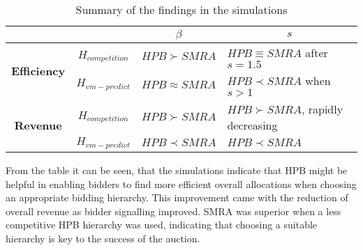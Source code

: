 \begin{table}[h]
	\centering
\begin{tabular}{cc|l|l|}
	\cline{3-4}
	\multicolumn{1}{l}{}                       & \multicolumn{1}{l|}{} & \multicolumn{1}{c|}{\textbf{$\beta$}} & \multicolumn{1}{c|}{\textbf{$s$}} \\ \hline
	\multicolumn{1}{|c|}{\multirow{2}{*}{\textbf{Efficiency}}} & $ H_{competition} $                    & $  HPB \succ SMRA $                         & $ HPB \equiv SMRA $ after $ s= 1.5 
	$                      \\ \cline{2-4} 
	\multicolumn{1}{|c|}{}                     & $ H_{vm-predict} $                 & $ HPB \approx SMRA$                         & $ HPB \prec SMRA $ when $ s > 1 $                      \\ \hline
	\multicolumn{1}{|c|}{\multirow{2}{*}{\textbf{Revenue}}} & $ H_{competition} $                    & $ HPB \succ SMRA $                         & $ HPB \succ SMRA $, rapidly decreasing                      \\ \cline{2-4} 
	\multicolumn{1}{|c|}{}                     & $ H_{vm-predict} $                  & $ HPB \prec SMRA $                         & $ HPB \prec SMRA $                      \\ \hline
\end{tabular}
	\caption{Summary of the findings in the simulations}\label{tbl:sim-results-summary}
\end{table}

From the table it can be seen, that the simulations indicate that HPB might be helpful in enabling bidders to find more efficient overall allocations when choosing an appropriate bidding hierarchy. This improvement came with the reduction of overall revenue as bidder signalling improved. SMRA was superior when a less competitive HPB hierarchy was used, indicating that choosing a suitable hierarchy is key to the success of the auction. 


%	
%	

